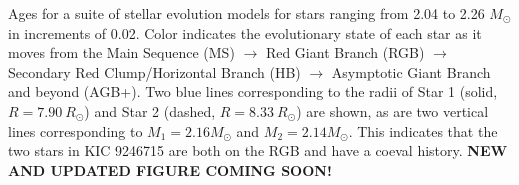 \label{fig:mesa} Ages for a suite of stellar evolution models for stars ranging from 2.04 to 2.26 $M_{\odot}$ in increments of 0.02. Color indicates the evolutionary state of each star as it moves from the Main Sequence (MS) $\rightarrow$ Red Giant Branch (RGB) $\rightarrow$ Secondary Red Clump/Horizontal Branch (HB) $\rightarrow$ Asymptotic Giant Branch and beyond (AGB+). Two blue lines corresponding to the radii of Star 1 (solid, $R = 7.90 \ R_\odot$) and Star 2 (dashed, $R = 8.33 \ R_\odot$) are shown, as are two vertical lines corresponding to $M_1 = 2.16 M_\odot$ and $M_2 = 2.14 M_\odot$. This indicates that the two stars in KIC 9246715 are both on the RGB and have a coeval history. \textbf{NEW AND UPDATED FIGURE COMING SOON!}
